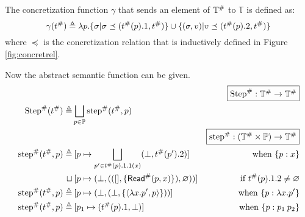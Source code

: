 The concretization function $\gamma$ that sends an element of ${\mathbb{T}}^{\#}$ to $\mathbb{T}$ is defined as:
\[\gamma({t}^{\#})\triangleq\lambda p.\{\sigma|\sigma\preceq({t}^{\#}(p).1,{t}^{\#})\}\cup\{(\sigma,v)|v\preceq({t}^{\#}(p).2,{t}^{\#})\}\]
where $\preceq$ is the concretization relation that is inductively defined in Figure \ref{fig:concretrel}.

Now the abstract semantic function can be given.
\begin{align*}
                                     &                                                                                                                                             & \fbox{$\Abs\Step:\Abs{\mathbb{T}}\rightarrow\Abs{\mathbb{T}}$}                   \\
  \Abs\Step(\Abs\ptree)   \triangleq & \bigsqcup_{p\in\mathbb{P}}\Abs\step(\Abs\ptree,p)                                                                                                                                                                              \\
                                     &                                                                                                                                             & \fbox{$\Abs\step:(\Abs{\mathbb{T}}\times\mathbb{P})\rightarrow\Abs{\mathbb{T}}$} \\
  \Abs\step(\Abs\ptree,p) \triangleq & \: [p\mapsto\bigsqcup_{p'\in\Abs\ptree(p).1.1(x)}(\bot,\Abs\ptree(p').2)]                                                                   & \text{when }\plabel{p}{x}                                                        \\
  \sqcup                             & \: [p\mapsto(\bot,(([],\{\Abs\ReadE(p,x)\}),\varnothing))]                                                                                  & \text{if }\Abs\ptree(p).1.2\neq\varnothing                                       \\
  \Abs\step(\Abs\ptree,p) \triangleq & \: [p\mapsto(\bot,(\bot,\{\langle\lambda x.p',p\rangle\}))]                                                                                 & \text{when }\plabel{p}{\lambda x.p'}                                             \\
  \Abs\step(\Abs\ptree,p) \triangleq & \: [p_1\mapsto(\Abs\ptree(p).1,\bot)]                                                                                                       & \text{when }\plabel{p}{p_1\:p_2}                                                 \\

\end{align*}
